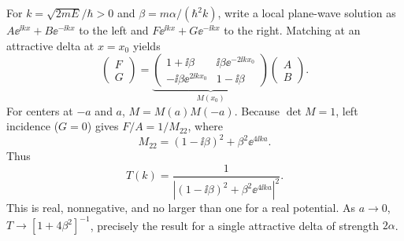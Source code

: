 For $k=\sqrt{2mE}/\hbar>0$ and
$\beta=m\alpha/(\hbar^2k)$, write a local plane-wave
solution as $A\ee^{\ii kx}+B\ee^{-\ii kx}$ to
the left and $F\ee^{\ii kx}+G\ee^{-\ii kx}$
to the right. Matching at an attractive delta at
$x=x_0$ yields
\begin{equation}
\begin{pmatrix}F\\G\end{pmatrix}=
\underbrace{\begin{pmatrix}
1+\ii\beta&\ii\beta\ee^{-2\ii kx_0}\\
-\ii\beta\ee^{2\ii kx_0}&1-\ii\beta
\end{pmatrix}}_{M(x_0)}
\begin{pmatrix}A\\B\end{pmatrix}.
\end{equation}
For centers at $-a$ and $a$, $M=M(a)M(-a)$.
Because $\det M=1$, left incidence ($G=0$) gives
$F/A=1/M_{22}$, where
\begin{equation}
M_{22}=(1-\ii\beta)^2+\beta^2\ee^{4\ii ka}.
\end{equation}
Thus
\begin{equation}
\boxed{T(k)=
\frac1{\left|(1-\ii\beta)^2+
\beta^2\ee^{4\ii ka}\right|^2}}.
\end{equation}
This is real, nonnegative, and no larger than one
for a real potential. As $a\to0$,
$T\to[1+4\beta^2]^{-1}$, precisely the result for
a single attractive delta of strength $2\alpha$.
